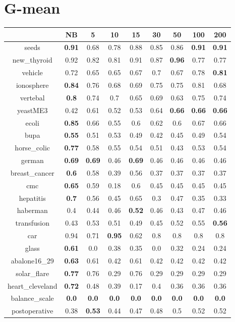 \documentclass{article}%
\begin{document}
%
\section*{G{-}mean}%
\begin{tabular}{c|cccccccc}%
&NB&5&10&15&30&50&100&200\\%
\hline%
seeds&\textbf{0.91}&0.68&0.78&0.88&0.85&0.86&\textbf{0.91}&\textbf{0.91}\\%
new\_thyroid&0.92&0.82&0.81&0.91&0.87&\textbf{0.96}&0.77&0.77\\%
vehicle&0.72&0.65&0.65&0.67&0.7&0.67&0.78&\textbf{0.81}\\%
ionosphere&\textbf{0.84}&0.76&0.68&0.69&0.75&0.75&0.81&0.68\\%
vertebal&\textbf{0.8}&0.74&0.7&0.65&0.69&0.63&0.75&0.74\\%
yeastME3&0.42&0.61&0.52&0.53&0.64&\textbf{0.66}&\textbf{0.66}&\textbf{0.66}\\%
ecoli&\textbf{0.85}&0.66&0.55&0.6&0.62&0.6&0.67&0.66\\%
bupa&\textbf{0.55}&0.51&0.53&0.49&0.42&0.45&0.49&0.54\\%
horse\_colic&\textbf{0.77}&0.58&0.55&0.54&0.51&0.43&0.53&0.54\\%
german&\textbf{0.69}&\textbf{0.69}&0.46&\textbf{0.69}&0.46&0.46&0.46&0.46\\%
breast\_cancer&\textbf{0.6}&0.58&0.39&0.56&0.37&0.37&0.37&0.37\\%
cmc&\textbf{0.65}&0.59&0.18&0.6&0.45&0.45&0.45&0.45\\%
hepatitis&\textbf{0.7}&0.56&0.45&0.65&0.3&0.47&0.35&0.33\\%
haberman&0.4&0.44&0.46&\textbf{0.52}&0.46&0.43&0.47&0.46\\%
transfusion&0.43&0.53&0.51&0.49&0.45&0.52&0.55&\textbf{0.56}\\%
car&0.94&0.71&\textbf{0.95}&0.62&0.8&0.8&0.8&0.8\\%
glass&\textbf{0.61}&0.0&0.38&0.35&0.0&0.32&0.24&0.24\\%
abalone16\_29&\textbf{0.63}&0.61&0.42&0.61&0.42&0.42&0.42&0.42\\%
solar\_flare&\textbf{0.77}&0.76&0.29&0.76&0.29&0.29&0.29&0.29\\%
heart\_cleveland&\textbf{0.72}&0.48&0.39&0.17&0.4&0.36&0.36&0.36\\%
balance\_scale&\textbf{0.0}&\textbf{0.0}&\textbf{0.0}&\textbf{0.0}&\textbf{0.0}&\textbf{0.0}&\textbf{0.0}&\textbf{0.0}\\%
postoperative&0.38&\textbf{0.53}&0.44&0.47&0.48&0.5&0.52&0.52\\%
\end{tabular}

%
\end{document}
